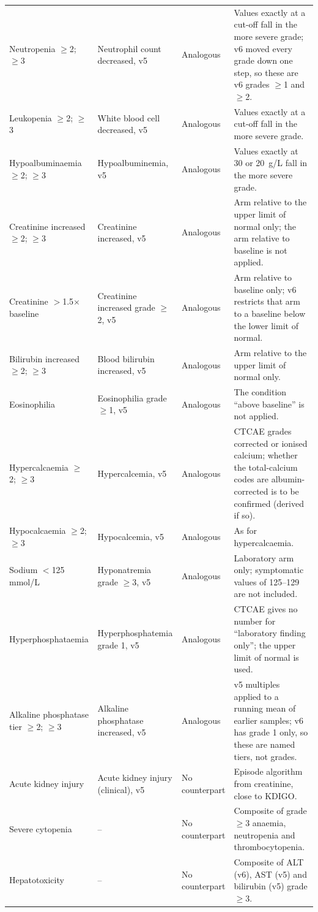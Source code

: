 \documentclass[10pt]{article}
\begin{document}
{\begin{longtable}{L{3.4cm}L{3.6cm}L{1.7cm}L{6.4cm}}
Neutropenia $\ge$2; $\ge$3 & Neutrophil count decreased, v5 & Analogous & Values exactly at a cut-off fall in the more severe grade; v6 moved every grade down one step, so these are v6 grades $\ge$1 and $\ge$2. \\
Leukopenia $\ge$2; $\ge$3 & White blood cell decreased, v5 & Analogous & Values exactly at a cut-off fall in the more severe grade. \\
Hypoalbuminaemia $\ge$2; $\ge$3 & Hypoalbuminemia, v5 & Analogous & Values exactly at 30 or 20~g/L fall in the more severe grade. \\
Creatinine increased $\ge$2; $\ge$3 & Creatinine increased, v5 & Analogous & Arm relative to the upper limit of normal only; the arm relative to baseline is not applied. \\
Creatinine $>$1.5$\times$ baseline & Creatinine increased grade $\ge$2, v5 & Analogous & Arm relative to baseline only; v6 restricts that arm to a baseline below the lower limit of normal. \\
Bilirubin increased $\ge$2; $\ge$3 & Blood bilirubin increased, v5 & Analogous & Arm relative to the upper limit of normal only. \\
Eosinophilia & Eosinophilia grade $\ge$1, v5 & Analogous & The condition ``above baseline'' is not applied. \\
Hypercalcaemia $\ge$2; $\ge$3 & Hypercalcemia, v5 & Analogous & CTCAE grades corrected or ionised calcium; whether the total-calcium codes are albumin-corrected is to be confirmed (derived if so). \\
Hypocalcaemia $\ge$2; $\ge$3 & Hypocalcemia, v5 & Analogous & As for hypercalcaemia. \\
Sodium $<$125 mmol/L & Hyponatremia grade $\ge$3, v5 & Analogous & Laboratory arm only; symptomatic values of 125--129 are not included. \\
Hyperphosphataemia & Hyperphosphatemia grade 1, v5 & Analogous & CTCAE gives no number for ``laboratory finding only''; the upper limit of normal is used. \\
Alkaline phosphatase tier $\ge$2; $\ge$3 & Alkaline phosphatase increased, v5 & Analogous & v5 multiples applied to a running mean of earlier samples; v6 has grade 1 only, so these are named tiers, not grades. \\
Acute kidney injury & Acute kidney injury (clinical), v5 & No counterpart & Episode algorithm from creatinine, close to KDIGO. \\
Severe cytopenia & -- & No counterpart & Composite of grade $\ge$3 anaemia, neutropenia and thrombocytopenia. \\
Hepatotoxicity & -- & No counterpart & Composite of ALT (v6), AST (v5) and bilirubin (v5) grade $\ge$3. \\
\end{longtable}}
\end{document}
